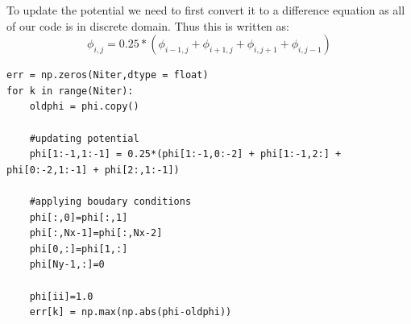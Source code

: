 \documentclass{article}
\begin{document}
To update the potential we need to first convert it to a difference equation as all of our code is in discrete domain. Thus this is written as:
\begin{equation*}
    \phi_{i,j} = 0.25*(\phi_{i-1,j} + \phi_{i+1,j} + \phi_{i,j+1} + \phi_{i,j-1})
\end{equation*}


\begin{lstlisting}
err = np.zeros(Niter,dtype = float)
for k in range(Niter):
    oldphi = phi.copy()
    
    #updating potential
    phi[1:-1,1:-1] = 0.25*(phi[1:-1,0:-2] + phi[1:-1,2:] + phi[0:-2,1:-1] + phi[2:,1:-1])
    
    #applying boudary conditions
    phi[:,0]=phi[:,1]
    phi[:,Nx-1]=phi[:,Nx-2]
    phi[0,:]=phi[1,:]
    phi[Ny-1,:]=0
    
    phi[ii]=1.0
    err[k] = np.max(np.abs(phi-oldphi))


\end{lstlisting}
\end{document}
